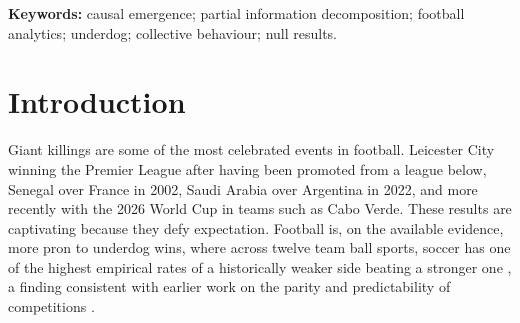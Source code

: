 \documentclass[11pt,a4paper]{article}
\begin{document}
\begin{abstract}
We also show that the whole-minus-sum criterion is a poor instrument in this experiment,
and that its failure is specific to macro features that are linear aggregates of
the micro state. For those features $\Psi>0$ in $0.004\,\%$ of windows there is no indication for the hypothesised positive emergence, while for velocity-similarity clustering,
which is not a linear aggregate, $\Psi>0$ in $25.3\,\%$. Across the experiment $\Psi$ is almost
entirely determined by the micro sum ($r=0.995$), and $24\,\%$ of individual
mutual-information terms sit at the estimator's finite-sample ceiling of $2.57$ nats,
imposing a saturation floor. Minimum detectable effect at $80\,\%$ power is
$|g|\approx0.58$. We report the nulls, the one live effect,
and the measurement pathology together, and give concrete recommendations through a
$\Phi$ID-based synergy measure, non-linear macro features, longer windows, and a
pre-registered replication of the gap-trend endpoint.
\end{abstract}

\vspace{0.5em}
\noindent\textbf{Keywords:} causal emergence; partial information decomposition; football
analytics; underdog; collective behaviour; null results.

\newpage
\tableofcontents
\newpage

\section{Introduction}

Giant killings are some of the most celebrated events in football. Leicester City winning the Premier League after having been promoted from a league below, Senegal over France in 2002, Saudi Arabia over Argentina in 2022, and more recently with the 2026 World Cup in teams such as Cabo Verde.
These results are captivating because they defy expectation. 
Football is, on the available evidence, more pron to underdog wins, where across
twelve team ball sports, soccer has one of the highest empirical rates of a
historically weaker side beating a stronger one \cite{vicente2024}, a finding consistent
with earlier work on the parity and predictability of competitions \cite{benNaim2006}.
\end{document}
